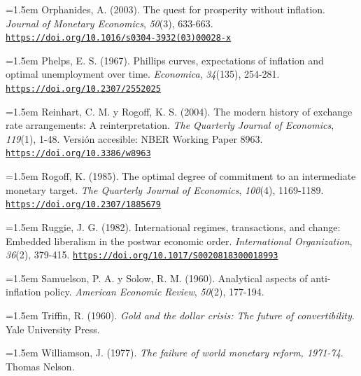 \documentclass[10pt,a4paper]{article}
\begin{document}
{\sloppy\noindent\hangindent=1.5em Orphanides, A. (2003). The quest for prosperity without inflation. \textit{Journal of Monetary Economics}, \textit{50}(3), 633-663. \href{https://doi.org/10.1016/s0304-3932(03)00028-x}{\nolinkurl{https://doi.org/10.1016/s0304-3932(03)00028-x}}\par}

{\sloppy\noindent\hangindent=1.5em Phelps, E. S. (1967). Phillips curves, expectations of inflation and optimal unemployment over time. \textit{Economica}, \textit{34}(135), 254-281. \href{https://doi.org/10.2307/2552025}{\nolinkurl{https://doi.org/10.2307/2552025}}\par}

{\sloppy\noindent\hangindent=1.5em Reinhart, C. M. y Rogoff, K. S. (2004). The modern history of exchange rate arrangements: A reinterpretation. \textit{The Quarterly Journal of Economics}, \textit{119}(1), 1-48. Versión accesible: NBER Working Paper 8963. \href{https://doi.org/10.3386/w8963}{\nolinkurl{https://doi.org/10.3386/w8963}}\par}

{\sloppy\noindent\hangindent=1.5em Rogoff, K. (1985). The optimal degree of commitment to an intermediate monetary target. \textit{The Quarterly Journal of Economics}, \textit{100}(4), 1169-1189. \href{https://doi.org/10.2307/1885679}{\nolinkurl{https://doi.org/10.2307/1885679}}\par}

{\sloppy\noindent\hangindent=1.5em Ruggie, J. G. (1982). International regimes, transactions, and change: Embedded liberalism in the postwar economic order. \textit{International Organization}, \textit{36}(2), 379-415. \href{https://doi.org/10.1017/S0020818300018993}{\nolinkurl{https://doi.org/10.1017/S0020818300018993}}\par}

{\sloppy\noindent\hangindent=1.5em Samuelson, P. A. y Solow, R. M. (1960). Analytical aspects of anti-inflation policy. \textit{American Economic Review}, \textit{50}(2), 177-194.\par}

{\sloppy\noindent\hangindent=1.5em Triffin, R. (1960). \textit{Gold and the dollar crisis: The future of convertibility}. Yale University Press.\par}

{\sloppy\noindent\hangindent=1.5em Williamson, J. (1977). \textit{The failure of world monetary reform, 1971-74}. Thomas Nelson.\par}
\end{document}

